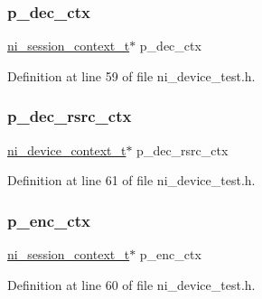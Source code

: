 \subsubsection{\texorpdfstring{p\_dec\_ctx}{p\_dec\_ctx}}
{\footnotesize\ttfamily \mbox{\hyperlink{ni__device__api_8h_a9fdb59b68eed0a6ee64b44827cbb729d}{ni\+\_\+session\+\_\+context\+\_\+t}}$\ast$ p\+\_\+dec\+\_\+ctx}



Definition at line 59 of file ni\+\_\+device\+\_\+test.\+h.

\mbox{\label{struct_send_data_struct___aa1910cac8a0d830cdefe42be0f679340}} 
\subsubsection{\texorpdfstring{p\_dec\_rsrc\_ctx}{p\_dec\_rsrc\_ctx}}
{\footnotesize\ttfamily \mbox{\hyperlink{ni__rsrc__api_8h_a880a361e6e867b45d102656e813a046f}{ni\+\_\+device\+\_\+context\+\_\+t}}$\ast$ p\+\_\+dec\+\_\+rsrc\+\_\+ctx}



Definition at line 61 of file ni\+\_\+device\+\_\+test.\+h.

\mbox{\label{struct_send_data_struct___a0dcef0baa36ca3470b4c561444d1b68c}} 
\subsubsection{\texorpdfstring{p\_enc\_ctx}{p\_enc\_ctx}}
{\footnotesize\ttfamily \mbox{\hyperlink{ni__device__api_8h_a9fdb59b68eed0a6ee64b44827cbb729d}{ni\+\_\+session\+\_\+context\+\_\+t}}$\ast$ p\+\_\+enc\+\_\+ctx}



Definition at line 60 of file ni\+\_\+device\+\_\+test.\+h.

\mbox{\label{struct_send_data_struct___a09d92e4609148acb4d096280e071c557}} 
